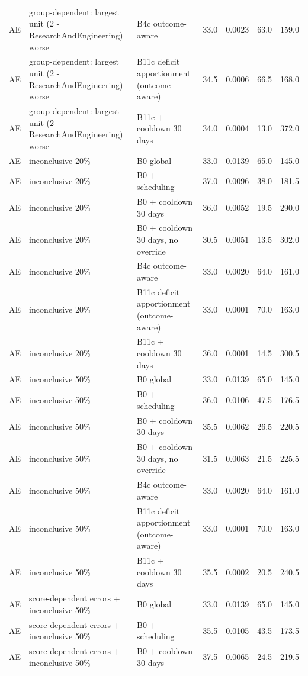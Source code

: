 \begin{longtable}{lp{5.2cm}p{4.4cm}cccc}
AE & group-dependent: largest unit (2 - ResearchAndEngineering) worse & B4c outcome-aware & 33.0 & 0.0023 & 63.0 & 159.0 \\
AE & group-dependent: largest unit (2 - ResearchAndEngineering) worse & B11c deficit apportionment (outcome-aware) & 34.5 & 0.0006 & 66.5 & 168.0 \\
AE & group-dependent: largest unit (2 - ResearchAndEngineering) worse & B11c + cooldown 30 days & 34.0 & 0.0004 & 13.0 & 372.0 \\
AE & inconclusive 20\% & B0 global & 33.0 & 0.0139 & 65.0 & 145.0 \\
AE & inconclusive 20\% & B0 + scheduling & 37.0 & 0.0096 & 38.0 & 181.5 \\
AE & inconclusive 20\% & B0 + cooldown 30 days & 36.0 & 0.0052 & 19.5 & 290.0 \\
AE & inconclusive 20\% & B0 + cooldown 30 days, no override & 30.5 & 0.0051 & 13.5 & 302.0 \\
AE & inconclusive 20\% & B4c outcome-aware & 33.0 & 0.0020 & 64.0 & 161.0 \\
AE & inconclusive 20\% & B11c deficit apportionment (outcome-aware) & 33.0 & 0.0001 & 70.0 & 163.0 \\
AE & inconclusive 20\% & B11c + cooldown 30 days & 36.0 & 0.0001 & 14.5 & 300.5 \\
AE & inconclusive 50\% & B0 global & 33.0 & 0.0139 & 65.0 & 145.0 \\
AE & inconclusive 50\% & B0 + scheduling & 36.0 & 0.0106 & 47.5 & 176.5 \\
AE & inconclusive 50\% & B0 + cooldown 30 days & 35.5 & 0.0062 & 26.5 & 220.5 \\
AE & inconclusive 50\% & B0 + cooldown 30 days, no override & 31.5 & 0.0063 & 21.5 & 225.5 \\
AE & inconclusive 50\% & B4c outcome-aware & 33.0 & 0.0020 & 64.0 & 161.0 \\
AE & inconclusive 50\% & B11c deficit apportionment (outcome-aware) & 33.0 & 0.0001 & 70.0 & 163.0 \\
AE & inconclusive 50\% & B11c + cooldown 30 days & 35.5 & 0.0002 & 20.5 & 240.5 \\
AE & score-dependent errors + inconclusive 50\% & B0 global & 33.0 & 0.0139 & 65.0 & 145.0 \\
AE & score-dependent errors + inconclusive 50\% & B0 + scheduling & 35.5 & 0.0105 & 43.5 & 173.5 \\
AE & score-dependent errors + inconclusive 50\% & B0 + cooldown 30 days & 37.5 & 0.0065 & 24.5 & 219.5 \\

\end{longtable}

